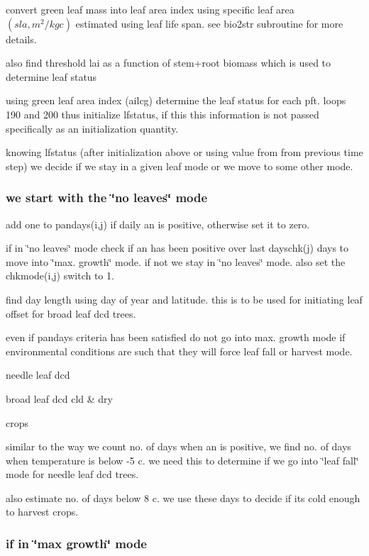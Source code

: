 convert green leaf mass into leaf area index using specific leaf area $(sla, m^2 /kg c)$ estimated using leaf life span. see bio2str subroutine for more details.

also find threshold lai as a function of stem+root biomass which is used to determine leaf status

using green leaf area index (ailcg) determine the leaf status for each pft. loops 190 and 200 thus initialize lfstatus, if this this information is not passed specifically as an initialization quantity.

knowing lfstatus (after initialization above or using value from from previous time step) we decide if we stay in a given leaf mode or we move to some other mode.

\subsubsection*{we start with the \char`\"{}no leaves\char`\"{} mode }

add one to pandays(i,j) if daily an is positive, otherwise set it to zero.

if in \char`\"{}no leaves\char`\"{} mode check if an has been positive over last dayschk(j) days to move into \char`\"{}max. growth\char`\"{} mode. if not we stay in \char`\"{}no leaves\char`\"{} mode. also set the chkmode(i,j) switch to 1.

find day length using day of year and latitude. this is to be used for initiating leaf offset for broad leaf dcd trees.

even if pandays criteria has been satisfied do not go into max. growth mode if environmental conditions are such that they will force leaf fall or harvest mode.

needle leaf dcd

broad leaf dcd cld \& dry

crops

similar to the way we count no. of days when an is positive, we find no. of days when temperature is below -\/5 c. we need this to determine if we go into \char`\"{}leaf fall\char`\"{} mode for needle leaf dcd trees.

also estimate no. of days below 8 c. we use these days to decide if its cold enough to harvest crops.

\subsubsection*{if in \char`\"{}max growth\char`\"{} mode }

